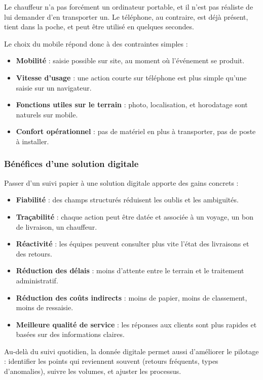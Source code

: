 \documentclass[12pt,a4paper]{article}
\begin{document}
    Le chauffeur n'a pas forcément un ordinateur portable, et il n'est pas réaliste de lui demander d'en transporter un. Le téléphone, au contraire, est déjà présent, tient dans la poche, et peut être utilisé en quelques secondes.

    Le choix du mobile répond donc à des contraintes simples :
    \begin{itemize}[leftmargin=1.2em]
    \item \textbf{Mobilité} : saisie possible sur site, au moment où l'événement se produit.
    \item \textbf{Vitesse d'usage} : une action courte sur téléphone est plus simple qu'une saisie sur un navigateur.
    \item \textbf{Fonctions utiles sur le terrain} : photo, localisation, et horodatage sont naturels sur mobile.
    \item \textbf{Confort opérationnel} : pas de matériel en plus à transporter, pas de poste à installer.
    \end{itemize}

    \subsubsection{Bénéfices d'une solution digitale}
    Passer d'un suivi papier à une solution digitale apporte des gains concrets :
    \begin{itemize}[leftmargin=1.2em]
    \item \textbf{Fiabilité} : des champs structurés réduisent les oublis et les ambiguïtés.
    \item \textbf{Traçabilité} : chaque action peut être datée et associée à un voyage, un bon de livraison, un chauffeur.
    \item \textbf{Réactivité} : les équipes peuvent consulter plus vite l'état des livraisons et des retours.
    \item \textbf{Réduction des délais} : moins d'attente entre le terrain et le traitement administratif.
    \item \textbf{Réduction des coûts indirects} : moins de papier, moins de classement, moins de ressaisie.
    \item \textbf{Meilleure qualité de service} : les réponses aux clients sont plus rapides et basées sur des informations claires.
    \end{itemize}

    Au-delà du suivi quotidien, la donnée digitale permet aussi d'améliorer le pilotage : identifier les points qui reviennent souvent (retours fréquents, types d'anomalies), suivre les volumes, et ajuster les processus.
\end{document}
